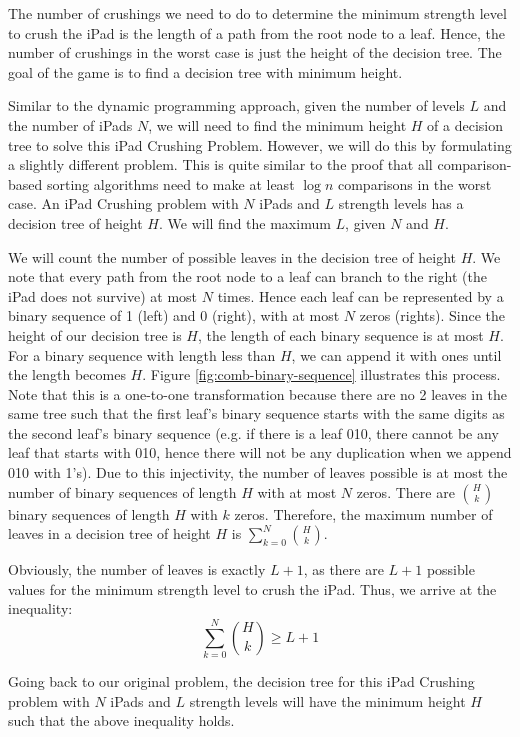 \documentclass[12pt,a4paper,oneside]{report}
\begin{document}
The number of crushings we need to do to determine the minimum strength level to crush the iPad is the length of a path from the root node to a leaf. Hence, the number of crushings in the worst case is just the height of the decision tree. The goal of the game is to find a decision tree with minimum height.

Similar to the dynamic programming approach, given the number of levels $L$ and the number of iPads $N$, we will need to find the minimum height $H$ of a decision tree to solve this iPad Crushing Problem. However, we will do this by formulating a slightly different problem. This is quite similar to the proof that all comparison-based sorting algorithms need to make at least $\log n$ comparisons in the worst case. An iPad Crushing problem with $N$ iPads and $L$ strength levels has a decision tree of height $H$. We will find the maximum $L$, given $N$ and $H$.

We will count the number of possible leaves in the decision tree of height $H$. We note that every path from the root node to a leaf can branch to the right (the iPad does not survive) at most $N$ times. Hence each leaf can be represented by a binary sequence of 1 (left) and 0 (right), with at most $N$ zeros (rights). Since the height of our decision tree is $H$, the length of each binary sequence is at most $H$. For a binary sequence with length less than $H$, we can append it with ones until the length becomes $H$. Figure \ref{fig:comb-binary-sequence} illustrates this process. Note that this is a one-to-one transformation because there are no 2 leaves in the same tree such that the first leaf's binary sequence starts with the same digits as the second leaf's binary sequence (e.g. if there is a leaf 010, there cannot be any leaf that starts with 010, hence there will not be any duplication when we append 010 with 1's). Due to this injectivity, the number of leaves possible is at most the number of binary sequences of length $H$ with at most $N$ zeros. There are ${H \choose k}$ binary sequences of length $H$ with $k$ zeros. Therefore, the maximum number of leaves in a decision tree of height $H$ is $\sum_{k=0}^{N} {H \choose k}$.

Obviously, the number of  leaves is exactly $L+1$, as there are $L+1$ possible values for the minimum strength level to crush the iPad. Thus, we arrive at the inequality: \[\sum_{k=0}^{N} {H \choose k} \geq L+1\]

Going back to our original problem, the decision tree for this iPad Crushing problem with $N$ iPads and $L$ strength levels will have the minimum height $H$ such that the above inequality holds.
\end{document}
